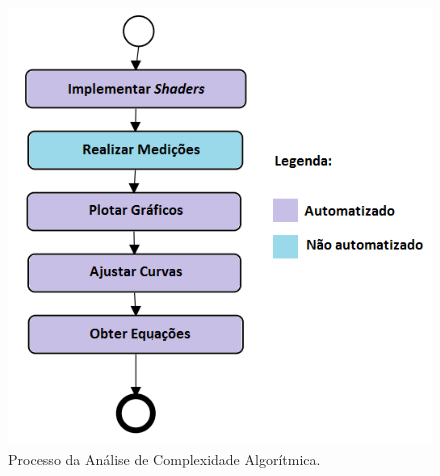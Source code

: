 	\begin{figure}[ht]
	\centering
		\includegraphics[keepaspectratio=true,scale=0.55]{figuras/processo.png}
	\caption{Processo da Análise de Complexidade Algorítmica.}
	\label{processo}
	\end{figure}

